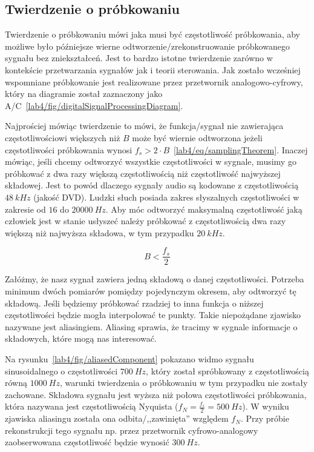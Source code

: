 \subsection{Twierdzenie o próbkowaniu}
Twierdzenie o próbkowaniu mówi jaka musi być częstotliwość próbkowania, aby możliwe było późniejsze wierne odtworzenie/zrekonstruowanie próbkowanego sygnału bez zniekształceń. Jest to bardzo istotne twierdzenie zarówno w kontekście przetwarzania sygnałów jak i teorii sterowania. Jak zostało wcześniej wspomniane próbkowanie jest realizowane przez przetwornik analogowo-cyfrowy, który na diagramie został zaznaczony jako A/C~\ref{lab4/fig/digitalSignalProcessingDiagram}.

Najprościej mówiąc twierdzenie to mówi, że funkcja/sygnał nie zawierająca częstotliwościowi większych niż $B$ może być wiernie odtworzona jeżeli częstotliwości próbkowania wynosi $f_s > 2\cdot B$~\ref{lab4/eq/samplingTheorem}. Inaczej mówiąc, jeśli chcemy odtworzyć wszystkie częstotliwości w sygnale, musimy go próbkować z dwa razy większą częstotliwością niż częstotliwość najwyższej składowej. Jest to powód dlaczego sygnały audio są kodowane z częstotliwością $48~kHz$ (jakość DVD). Ludzki słuch posiada zakres słyszalnych częstotliwości w zakresie od $16$ do $20000~Hz$. Aby móc odtworzyć maksymalną częstotliwość jaką człowiek jest w stanie usłyszeć należy próbkować z częstotliwością dwa razy większą niż najwyższa składowa, w tym przypadku $20~kHz$.

\begin{equation}\label{lab4/eq/samplingTheorem}
	B < \frac{f_s}{2}
\end{equation}

Załóżmy, że nasz sygnał zawiera jedną składową o danej częstotliwości. Potrzeba minimum dwóch pomiarów pomiędzy pojedynczym okresem, aby odtworzyć tę składową. Jeśli będziemy próbkować rzadziej to inna funkcja o niższej częstotliwości będzie mogła interpolować te punkty. Takie niepożądane zjawisko nazywane jest aliasingiem. Aliasing sprawia, że tracimy w sygnale informacje o składowych, które mogą nas interesować.

Na rysunku~\ref{lab4/fig/aliasedComponent} pokazano widmo sygnału sinusoidalnego o częstotliwości $700~Hz$, który został spróbkowany z częstotliwością równą $1000~Hz$, warunki twierdzenia o próbkowaniu w tym przypadku nie zostały zachowane. Składowa sygnału jest wyższa niż połowa częstotliwości próbkowania, która nazywana jest częstotliwością Nyquista ($f_N = \frac{f_s}{2} = 500~Hz$). W wyniku zjawiska aliasingu została ona odbita/,,zawinięta'' względem $f_N$. Przy próbie rekonstrukcji tego sygnału np. przez przetwornik cyfrowo-analogowy zaobserwowana częstotliwość będzie wynosić $300~Hz$.

